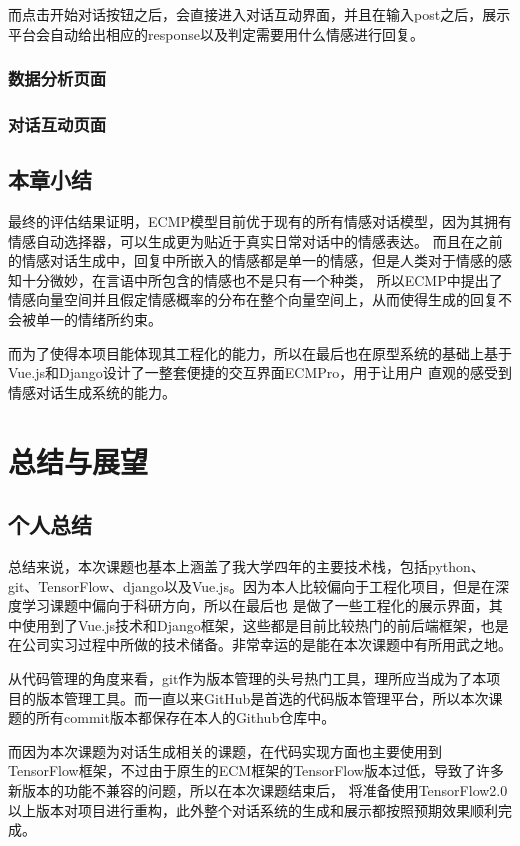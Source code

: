 \documentclass[supercite]{HustGraduPaper}
\theoremstyle{definition}
\begin{document}
而点击开始对话按钮之后，会直接进入对话互动界面，并且在输入post之后，展示平台会自动给出相应的response以及判定需要用什么情感进行回复。

\subsubsection{数据分析页面}

\subsubsection{对话互动页面}

\subsection{本章小结}
最终的评估结果证明，ECMP模型目前优于现有的所有情感对话模型，因为其拥有情感自动选择器，可以生成更为贴近于真实日常对话中的情感表达。
而且在之前的情感对话生成中，回复中所嵌入的情感都是单一的情感，但是人类对于情感的感知十分微妙，在言语中所包含的情感也不是只有一个种类，
所以ECMP中提出了情感向量空间并且假定情感概率的分布在整个向量空间上，从而使得生成的回复不会被单一的情绪所约束。

而为了使得本项目能体现其工程化的能力，所以在最后也在原型系统的基础上基于Vue.js和Django设计了一整套便捷的交互界面ECMPro，用于让用户
直观的感受到情感对话生成系统的能力。


\section{总结与展望}
\subsection{个人总结}
总结来说，本次课题也基本上涵盖了我大学四年的主要技术栈，包括python、git、TensorFlow、django以及Vue.js。因为本人比较偏向于工程化项目，但是在深度学习课题中偏向于科研方向，所以在最后也
是做了一些工程化的展示界面，其中使用到了Vue.js技术和Django框架，这些都是目前比较热门的前后端框架，也是在公司实习过程中所做的技术储备。非常幸运的是能在本次课题中有所用武之地。

从代码管理的角度来看，git作为版本管理的头号热门工具，理所应当成为了本项目的版本管理工具。而一直以来GitHub是首选的代码版本管理平台，所以本次课题的所有commit版本都保存在本人的Github仓库中。

而因为本次课题为对话生成相关的课题，在代码实现方面也主要使用到TensorFlow框架，不过由于原生的ECM框架的TensorFlow版本过低，导致了许多新版本的功能不兼容的问题，所以在本次课题结束后，
将准备使用TensorFlow2.0以上版本对项目进行重构，此外整个对话系统的生成和展示都按照预期效果顺利完成。
\end{document}
